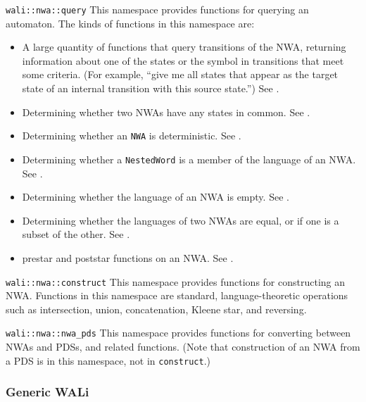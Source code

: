 \begin{description}
  \item\texttt{wali::nwa::query} This namespace provides functions for
    querying an automaton. The kinds of functions in this namespace are:
    \begin{itemize}
      \item A large quantity of functions that query transitions of
        the NWA, returning information about one of the states or the symbol
        in transitions that meet some criteria. (For example, ``give me all
        states that appear as the target state of an internal transition with
        this source state.'') See .
      \item Determining whether two NWAs have any states in
        common. See .
      \item Determining whether an \texttt{NWA} is deterministic. See
        .
      \item Determining whether a \texttt{NestedWord} is a member of the
        language of an NWA. See .
      \item Determining whether the language of an NWA is empty. See
        .
      \item Determining whether the languages of two NWAs are equal, or if
        one is a subset of the other. See .
      \item prestar and poststar functions on an NWA. See
        .
    \end{itemize}
    
  \item\texttt{wali::nwa::construct} This namespace provides functions for
    constructing an NWA. Functions in this namespace are standard,
    language-theoretic operations such as intersection, union, concatenation,
    Kleene star, and reversing.
  \item\texttt{wali::nwa::nwa\_pds} This namespace provides functions for
    converting between NWAs and PDSs, and related functions. (Note that
    construction of an NWA from a PDS is in this namespace, not in
    \texttt{construct}.)
\end{description}


\subsubsection{Generic WALi}

